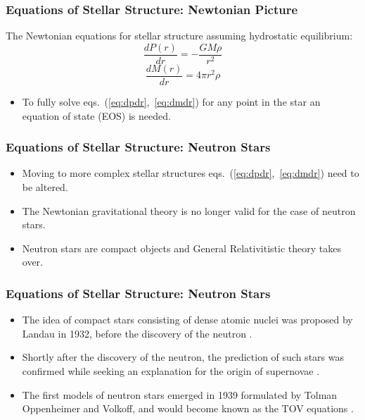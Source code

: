 \documentclass{beamer}
\begin{document}
\begin{frame}
\frametitle{Equations of Stellar Structure: Newtonian Picture}
The Newtonian equations for stellar structure assuming hydrostatic equilibrium:
\begin{equation}\label{eq:dpdr}
\frac{dP(r)}{dr} = -\frac{GM\rho}{r^2}
\end{equation}
\begin{equation}\label{eq:dmdr}
\frac{dM(r)}{dr} = 4\pi r^2 \rho
\end{equation}
\begin{itemize}
\item To fully solve eqs.~(\ref{eq:dpdr},~\ref{eq:dmdr}) for any point in the star an equation of state (EOS) is needed.
\end{itemize}
\end{frame}


\begin{frame}
\frametitle{Equations of Stellar Structure: Neutron Stars}
\begin{itemize}
\item Moving to more complex stellar structures eqs.~(\ref{eq:dpdr},~\ref{eq:dmdr}) need to be altered.
\item The Newtonian gravitational theory is no longer valid for the case of neutron stars. 
\item Neutron stars are compact objects and General Relativitistic theory takes over.
\end{itemize}
\end{frame}


\begin{frame}
\frametitle{Equations of Stellar Structure: Neutron Stars}
\begin{itemize}
\item The idea of compact stars consisting of dense atomic nuclei was proposed by Landau in 1932, before the discovery of the neutron \cite{landau}.
\item Shortly after the discovery of the neutron, the prediction of such stars was confirmed while seeking an explanation for the origin of supernovae \cite{baade}.
\item The first models of neutron stars emerged in 1939 formulated by Tolman Oppenheimer and Volkoff, and would become known as the TOV equations \cite{tov1939}.
\end{itemize}

\end{frame}
\end{document}
